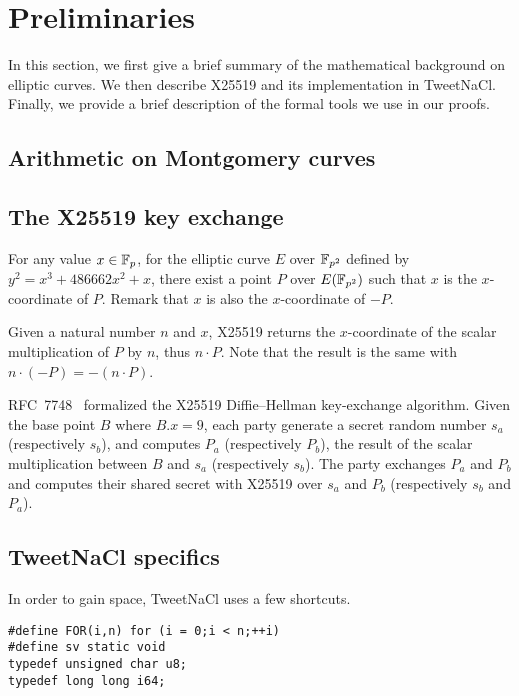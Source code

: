 \section{Preliminaries}
\label{preliminaries}

In this section, we first give a brief summary of the mathematical background
on elliptic curves. We then describe X25519 and its implementation in TweetNaCl.
Finally, we provide a brief description of the formal tools we use in our proofs.

\subsection{Arithmetic on Montgomery curves}
\label{subsec:montgomery}


\subsection{The X25519 key exchange}
\label{preliminaries:A}


For any value $x \in \mathbb{F}_{p}$, for the elliptic curve $E$ over $\mathbb{F}_{p^2}$
defined by $y^2 = x^3 + 486662 x^2 + x$, there exist a point $P$ over $E(\mathbb{F}_{p^2})$
such that $x$ is the $x$-coordinate of $P$.
Remark that $x$ is also the $x$-coordinate of $-P$.

Given a natural number $n$ and $x$, X25519 returns the $x$-coordinate of the
scalar multiplication of $P$ by $n$, thus $n \cdot P$. Note that the result is the
same with $n \cdot (-P) = -(n \cdot P)$.

RFC~7748~\cite{rfc7748} formalized the X25519 Diffie–Hellman key-exchange algorithm.
Given the base point $B$ where $B.x=9$, each party generate a secret random number
$s_a$ (respectively $s_b$), and computes $P_a$ (respectively $P_b$), the result
of the scalar multiplication between $B$ and $s_a$ (respectively $s_b$).
The party exchanges $P_a$ and $P_b$ and computes their shared secret with X25519
over $s_a$ and $P_b$ (respectively $s_b$ and $P_a$).

\subsection{TweetNaCl specifics}
\label{preliminaries:B}
In order to gain space, TweetNaCl uses a few shortcuts.
\begin{lstlisting}[language=Ctweetnacl]
#define FOR(i,n) for (i = 0;i < n;++i)
#define sv static void
typedef unsigned char u8;
typedef long long i64;
\end{lstlisting}

